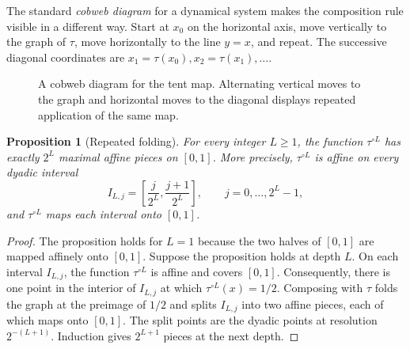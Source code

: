 \documentclass[11pt,twoside]{article}
\newtheorem{proposition}[theorem]{Proposition}
\theoremstyle{definition}
\theoremstyle{remark}
\begin{document}
The standard \emph{cobweb diagram} for a dynamical system makes the
composition rule visible in a different way. Start at $x_0$ on the horizontal
axis, move vertically to the graph of $\tau$, move horizontally to the line
$y=x$, and repeat. The successive diagonal coordinates are
$x_1=\tau(x_0),x_2=\tau(x_1),\ldots$.

\begin{figure}[ht]
\centering
{}
\caption{A cobweb diagram for the tent map. Alternating vertical moves to
the graph and horizontal moves to the diagonal displays repeated application
of the same map.}
\label{fig:tent-cobweb}
\end{figure}

\begin{proposition}[Repeated folding]
\label{prop:tent-pieces}
For every integer $L\geq1$, the function $\tau^{\circ L}$ has exactly $2^L$
maximal affine pieces on $[0,1]$. More precisely, $\tau^{\circ L}$ is affine on every
dyadic interval
\[
 I_{L,j}=\left[\frac{j}{2^L},\frac{j+1}{2^L}\right],
 \qquad j=0,\ldots,2^L-1,
\]
and $\tau^{\circ L}$ maps each interval onto $[0,1]$.
\end{proposition}

\begin{proof}
The proposition holds for $L=1$ because the two halves of $[0,1]$ are mapped
affinely onto $[0,1]$. Suppose the proposition holds at depth $L$. On each
interval
$I_{L,j}$, the function $\tau^{\circ L}$ is affine and covers $[0,1]$.
Consequently, there is one point in the interior of $I_{L,j}$ at which
$\tau^{\circ L}(x)=1/2$. Composing with $\tau$ folds the graph at the preimage
of $1/2$ and splits $I_{L,j}$ into two affine pieces, each of which maps onto
$[0,1]$. The split points are the dyadic points at resolution $2^{-(L+1)}$.
Induction gives $2^{L+1}$ pieces at the next depth.
\end{proof}
\end{document}
